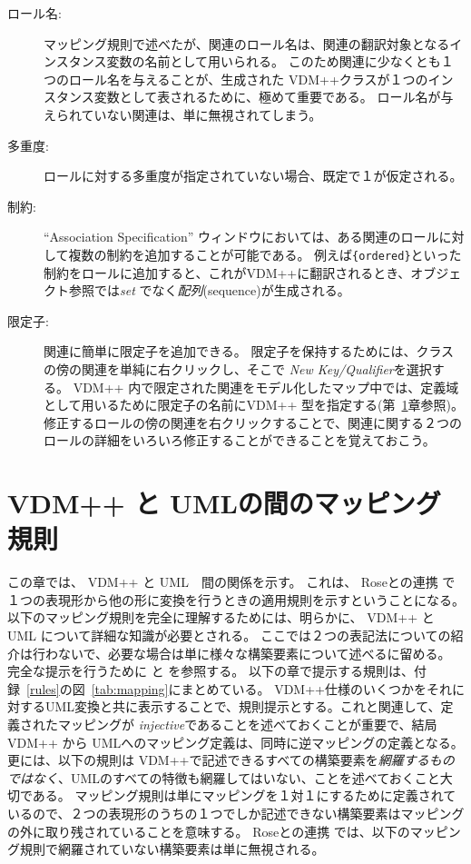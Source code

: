 \documentclass[\pformat,12pt]{jarticle}
\newcommand{\vdmpp}{VDM++}
\newcommand{\link}{Roseとの連携}
\begin{document}
\begin{itemize}
\begin{description}
\item [ロール名:] マッピング規則で述べたが、関連のロール名は、関連の翻訳対象となるインスタンス変数の名前として用いられる。
このため関連に少なくとも１つのロール名を与えることが、生成された \vdmpp{}クラスが１つのインスタンス変数として表されるために、極めて重要である。
ロール名が与えられていない関連は、単に無視されてしまう。
\item [多重度:] ロールに対する多重度が指定されていない場合、既定で１が仮定される。
\item [制約:]  ``Association Specification'' ウィンドウにおいては、ある関連のロールに対して複数の制約を追加することが可能である。
例えば{\tt \{ordered\}}といった制約をロールに追加すると、これが\vdmpp{}に翻訳されるとき、オブジェクト参照では{\it set} でなく{\it 配列}(sequence)が生成される。
\item [限定子:] 関連に簡単に限定子を追加できる。
  限定子を保持するためには、クラスの傍の関連を単純に右クリックし、そこで {\em New Key/Qualifier}を選択する。
\vdmpp{} 内で限定された関連をモデル化したマップ中では、定義域として用いるために限定子の名前に\vdmpp{} 型を指定する(第~\ref{mapping}章参照)。
修正するロールの傍の関連を右クリックすることで、関連に関する２つのロールの詳細をいろいろ修正することができることを覚えておこう。
\end{description}  

\end{itemize}
  
\newpage  
\section{VDM++ と UMLの間のマッピング規則} \label{mapping}
  
この章では、 \vdmpp{} と UML　間の関係を示す。
これは、 \link{} で１つの表現形から他の形に変換を行うときの適用規則を示すということになる。
以下のマッピング規則を完全に理解するためには、明らかに、 \vdmpp{}  と UML について詳細な知識が必要とされる。
ここでは２つの表記法についての紹介は行わないで、必要な場合は単に様々な構築要素について述べるに留める。
完全な提示を行うために \cite{LangManPP-SCSK} と \cite{Booch&97} を参照する。
以下の章で提示する規則は、付録~\ref{rules}の図~\ref{tab:mapping}にまとめている。
 \vdmpp{}仕様のいくつかをそれに対するUML変換と共に表示することで、規則提示とする。これと関連して、定義されたマッピングが {\it  injective}であることを述べておくことが重要で、結局 \vdmpp{} から UMLへのマッピング定義は、同時に逆マッピングの定義となる。
更には、以下の規則は \vdmpp{}で記述できるすべての構築要素を{\it 網羅するものではなく}、UMLのすべての特徴も網羅してはいない、ことを述べておくこと大切である。
マッピング規則は単にマッピングを１対１にするために定義されているので、２つの表現形のうちの１つでしか記述できない構築要素はマッピングの外に取り残されていることを意味する。
 \link{} では、以下のマッピング規則で網羅されていない構築要素は単に無視される。
\end{document}
